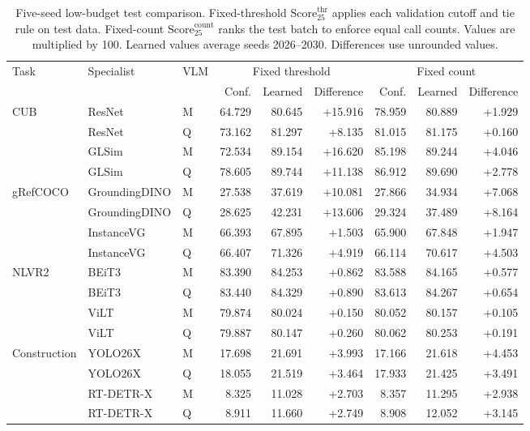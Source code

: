 \begin{table}[H]
\centering
\caption{Five-seed low-budget test comparison. Fixed-threshold $\mathrm{Score}_{25}^{\mathrm{thr}}$ applies each validation cutoff and tie rule on test data. Fixed-count $\mathrm{Score}_{25}^{\mathrm{count}}$ ranks the test batch to enforce equal call counts. Values are multiplied by 100. Learned values average seeds 2026--2030. Differences use unrounded values.}
\label{tab:budgetarea}
\small
\setlength{\tabcolsep}{4pt}
\begin{tabular}{@{}lllrrrrrr@{}}
\toprule
Task & Specialist & VLM & \multicolumn{3}{c}{Fixed threshold} & \multicolumn{3}{c}{Fixed count} \\
\cmidrule(lr){4-6}\cmidrule(l){7-9}
 & & & Conf. & Learned & Difference & Conf. & Learned & Difference \\
\midrule
CUB & ResNet & M & 64.729 & 80.645 & +15.916 & 78.959 & 80.889 & +1.929 \\
 & ResNet & Q & 73.162 & 81.297 & +8.135 & 81.015 & 81.175 & +0.160 \\
 & GLSim & M & 72.534 & 89.154 & +16.620 & 85.198 & 89.244 & +4.046 \\
 & GLSim & Q & 78.605 & 89.744 & +11.138 & 86.912 & 89.690 & +2.778 \\
\midrule
gRefCOCO & GroundingDINO & M & 27.538 & 37.619 & +10.081 & 27.866 & 34.934 & +7.068 \\
 & GroundingDINO & Q & 28.625 & 42.231 & +13.606 & 29.324 & 37.489 & +8.164 \\
 & InstanceVG & M & 66.393 & 67.895 & +1.503 & 65.900 & 67.848 & +1.947 \\
 & InstanceVG & Q & 66.407 & 71.326 & +4.919 & 66.114 & 70.617 & +4.503 \\
\midrule
NLVR2 & BEiT3 & M & 83.390 & 84.253 & +0.862 & 83.588 & 84.165 & +0.577 \\
 & BEiT3 & Q & 83.440 & 84.329 & +0.890 & 83.613 & 84.267 & +0.654 \\
 & ViLT & M & 79.874 & 80.024 & +0.150 & 80.052 & 80.157 & +0.105 \\
 & ViLT & Q & 79.887 & 80.147 & +0.260 & 80.062 & 80.253 & +0.191 \\
\midrule
Construction & YOLO26X & M & 17.698 & 21.691 & +3.993 & 17.166 & 21.618 & +4.453 \\
 & YOLO26X & Q & 18.055 & 21.519 & +3.464 & 17.933 & 21.425 & +3.491 \\
 & RT-DETR-X & M & 8.325 & 11.028 & +2.703 & 8.357 & 11.295 & +2.938 \\
 & RT-DETR-X & Q & 8.911 & 11.660 & +2.749 & 8.908 & 12.052 & +3.145 \\
\bottomrule
\end{tabular}
\end{table}
